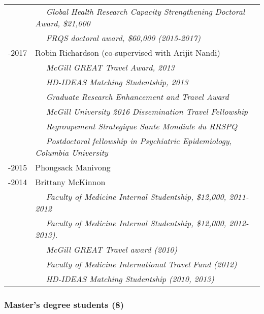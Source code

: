 \documentclass[
  letterpaper,
  DIV=11,
  numbers=noendperiod]{scrartcl}
\begin{document}
\begin{longtable}[]{@{}
  >{\raggedright\arraybackslash}p{}
  >{\raggedright\arraybackslash}p{}@{}}
& ~~ \emph{Global Health Research Capacity Strengthening Doctoral Award,
\$21,000} \\
& ~~ \emph{FRQS doctoral award, \$60,000 (2015-2017)} \\
2013-2017 & Robin Richardson (co-supervised with Arijit Nandi) \\
& ~~ \emph{McGill GREAT Travel Award, 2013} \\
& ~~ \emph{HD-IDEAS Matching Studentship, 2013} \\
& ~~ \emph{Graduate Research Enhancement and Travel Award} \\
& ~~ \emph{McGill University 2016 Dissemination Travel Fellowship } \\
& ~~ \emph{Regroupement Strategique Sante Mondiale du RRSPQ} \\
& ~~ \emph{Postdoctoral fellowship in Psychiatric Epidemiology, Columbia
University} \\
2011-2015 & Phongsack Manivong \\
2009-2014 & Brittany McKinnon \\
& ~~ \emph{Faculty of Medicine Internal Studentship, \$12,000,
2011-2012} \\
& ~~ \emph{Faculty of Medicine Internal Studentship, \$12,000,
2012-2013).} \\
& ~~ \emph{McGill GREAT Travel award (2010)} \\
& ~~ \emph{Faculty of Medicine International Travel Fund (2012)} \\
& ~~ \emph{HD-IDEAS Matching Studentship (2010, 2013)} \\
\end{longtable}

\subsubsection{Master's degree students
(8)}\label{masters-degree-students-8}
\end{document}
